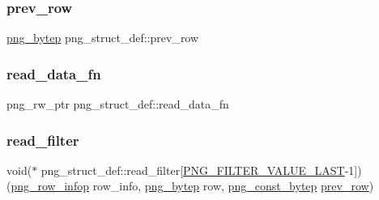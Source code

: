 \mbox{\label{structpng__struct__def_af307f45d48c7900d1036388bccbed7bb}} 
\subsubsection{\texorpdfstring{prev\+\_\+row}{prev\_row}}
{\footnotesize\ttfamily \mbox{\hyperlink{pngconf_8h_a759e1c893f977ec7b67820bc3ca37524}{png\+\_\+bytep}} png\+\_\+struct\+\_\+def\+::prev\+\_\+row}

\mbox{\label{structpng__struct__def_a83804076437d1587fab947c056bb56ae}} 
\subsubsection{\texorpdfstring{read\+\_\+data\+\_\+fn}{read\_data\_fn}}
{\footnotesize\ttfamily png\+\_\+rw\+\_\+ptr png\+\_\+struct\+\_\+def\+::read\+\_\+data\+\_\+fn}

\mbox{\label{structpng__struct__def_a669016ed081452035d16f3a93740d663}} 
\subsubsection{\texorpdfstring{read\+\_\+filter}{read\_filter}}
{\footnotesize\ttfamily void($\ast$ png\+\_\+struct\+\_\+def\+::read\+\_\+filter\mbox{[}\mbox{\hyperlink{png_8h_a9bcc6cc30ac1504e9c194b890c17ad94}{P\+N\+G\+\_\+\+F\+I\+L\+T\+E\+R\+\_\+\+V\+A\+L\+U\+E\+\_\+\+L\+A\+ST}}-\/1\mbox{]})(\mbox{\hyperlink{png_8h_a5c04feca9d1d83a2fd29909c50327dd9}{png\+\_\+row\+\_\+infop}} row\+\_\+info, \mbox{\hyperlink{pngconf_8h_a759e1c893f977ec7b67820bc3ca37524}{png\+\_\+bytep}} row, \mbox{\hyperlink{pngconf_8h_a2e608af822427492832d11909c2f3fee}{png\+\_\+const\+\_\+bytep}} \mbox{\hyperlink{structpng__struct__def_af307f45d48c7900d1036388bccbed7bb}{prev\+\_\+row}})}


